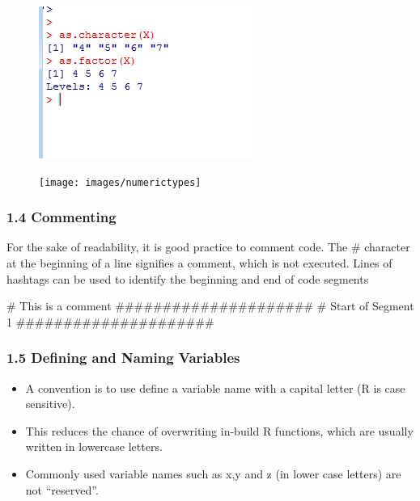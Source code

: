  
 \begin{figure}
 \centering
 \includegraphics[width=0.7\linewidth]{images/typeconversion} 
 \end{figure}
    
 
 
 
 
 \begin{figure}
 \centering
 \texttt{[image: images/numerictypes]}    
 \end{figure}
    
 
 \frametitle{1.4 Commenting}
 For the sake of readability, it is good practice to comment code. The \# character at the
 beginning of a line signifies a comment, which is not executed. Lines of hashtags can be used
 to identify the beginning and end of code segments
 \begin{framed}
 \begin{semiverbatim}
 # This is a comment
 #####################
 # Start of Segment 1
 #####################
 \end{semiverbatim}
 \end{framed}
 
 
 \frametitle{1.5 Defining and Naming Variables}
 \begin{itemize}
 \item A convention is to use define a variable name with a capital letter (R is case sensitive). 
 \item This
 reduces the chance of overwriting in-build R functions, which are usually written in lowercase
 letters. 
 \item Commonly used variable names such as x,y and z (in lower case letters) are not “reserved”.
 \end{itemize}
 
